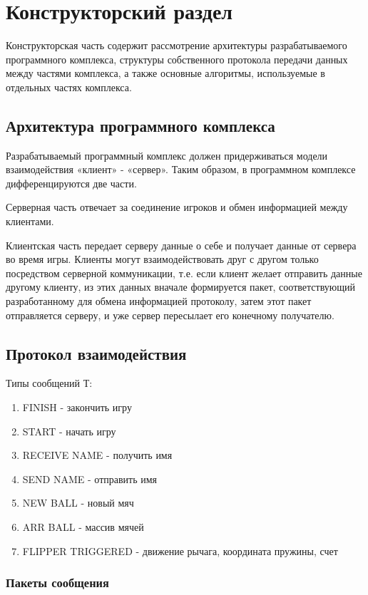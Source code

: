 \chapter{Конструкторский раздел}

Конструкторская часть содержит рассмотрение архитектуры разрабатываемого программного комплекса, структуры собственного протокола передачи данных между частями комплекса, а также основные алгоритмы, используемые в отдельных частях комплекса.

\section{Архитектура программного комплекса}
Разрабатываемый программный комплекс должен придерживаться модели взаимодействия «клиент» - «сервер». Таким образом, в программном комплексе дифференцируются две части. 

Серверная часть отвечает за соединение игроков и обмен информацией между клиентами. 

Клиентская часть передает серверу данные о себе и получает данные от сервера во время игры. Клиенты могут взаимодействовать друг с другом только посредством серверной коммуникации, т.е. если клиент желает отправить данные другому клиенту, из этих данных вначале формируется пакет, соответствующий разработанному для обмена информацией протоколу, затем этот пакет отправляется серверу, и уже сервер пересылает его конечному получателю.

\section{Протокол взаимодействия}

Типы сообщений Т:
\begin{enumerate}
\item FINISH - закончить игру
\item START - начать игру
\item RECEIVE NAME - получить имя
\item SEND NAME - отправить имя
\item NEW BALL - новый мяч
\item ARR BALL - массив мячей
\item FLIPPER TRIGGERED - движение рычага, координата пружины, счет
\end{enumerate}

\subsection{Пакеты сообщения}

